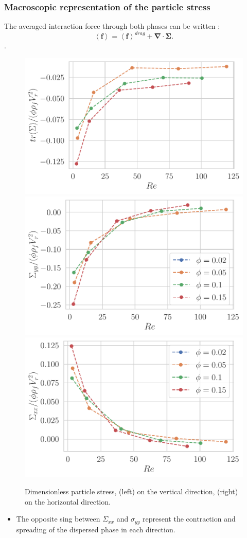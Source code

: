 \documentclass{sintefbeamer}
\newcommand{\avg}[1]{\left<#1\right>}
\newcommand{\nablab}{\bm{\nabla}}
\begin{document}
\begin{frame}
  \frametitle{Macroscopic representation of the particle stress}
The averaged interaction force through both phases can be written : 
\begin{equation*}
  \avg{\textbf{f}}
  =\avg{\textbf{f}}^{drag}
  + \nablab \cdot \bm{\Sigma}.
\end{equation*}. 
  \begin{figure}
    
    \includegraphics[height=0.15\textwidth]{image/Dim_3/fPA/PFP.pdf}
    \includegraphics[height=0.15\textwidth]{image/Dim_3/fPA/PFP_y_y.pdf}
    \includegraphics[height=0.15\textwidth]{image/Dim_3/fPA/PFP_x_x.pdf}
    
    \caption{Dimensionless particle stress, (left) on the vertical direction, (right) on the horizontal direction.}
  \end{figure}
\begin{itemize}
  \item The opposite sing between $\Sigma_{xx}$ and $\sigma_{yy}$ represent the contraction and spreading of the dispersed phase in each direction. 
\end{itemize}
\end{frame}
\end{document}
